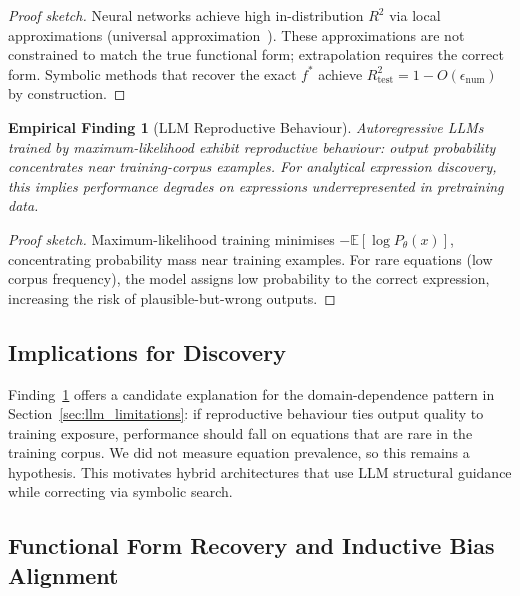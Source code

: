 \documentclass[twoside,11pt]{article}
\newcommand{\Rsq}{R^{2}}
\newcommand{\Rtest}{R^{2}_{\mathrm{test}}}
\newtheorem{finding}{Empirical Finding}
\begin{document}
\begin{proof}[Proof sketch]
Neural networks achieve high in-distribution $\Rsq$ via local approximations (universal approximation~\citep{hornik1989multilayer}). These approximations are not constrained to match the true functional form; extrapolation requires the correct form. Symbolic methods that recover the exact $f^*$ achieve $\Rtest = 1 - O(\epsilon_{\text{num}})$ by construction.
\end{proof}

\begin{finding}[LLM Reproductive Behaviour]
\label{thm:llm_reproductive}
Autoregressive LLMs trained by maximum-likelihood exhibit reproductive behaviour: output probability concentrates near training-corpus examples. For analytical expression discovery, this implies performance degrades on expressions underrepresented in pretraining data.
\end{finding}

\begin{proof}[Proof sketch]
Maximum-likelihood training minimises $-\mathbb{E}[\log P_\theta(x)]$, concentrating probability mass near training examples. For rare equations (low corpus frequency), the model assigns low probability to the correct expression, increasing the risk of plausible-but-wrong outputs.
\end{proof}

\subsection{Implications for Discovery}\label{subsec:implications-for-discovery}
\label{sec:theory_implications}

Finding~\ref{thm:llm_reproductive} offers a candidate explanation for the domain-dependence pattern in Section~\ref{sec:llm_limitations}: if reproductive behaviour ties output quality to training exposure, performance should fall on equations that are rare in the training corpus. We did not measure equation prevalence, so this remains a hypothesis. This motivates hybrid architectures that use LLM structural guidance while correcting via symbolic search.

\subsection{Functional Form Recovery and Inductive Bias Alignment}\label{subsec:functional-form-recovery-and-inductive-b}
\label{sec:theory_recovery}
\end{document}
